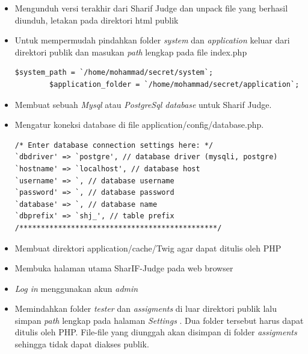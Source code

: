 \begin{itemize}
    \item Mengunduh versi terakhir dari Sharif Judge dan unpack file yang berhasil diunduh, letakan pada direktori html publik
    \item Untuk mempermudah pindahkan folder \textit{system}  dan \textit{application} keluar dari direktori publik dan masukan \textit{path} lengkap pada file index.php

     \begin{lstlisting}[basicstyle=\ttfamily, frame=single,
    columns=fullflexible, breaklines=true, numbers=none]
        $system_path = `/home/mohammad/secret/system`;
        $application_folder = `/home/mohammad/secret/application`;
    \end{lstlisting}

    \item Membuat sebuah \textit{Mysql} atau \textit{PostgreSql database} untuk Sharif Judge.
    \item Mengatur koneksi database di file application/config/database.php.

 \begin{lstlisting}[basicstyle=\ttfamily, frame=single,
    columns=fullflexible, breaklines=true, numbers=none]
/* Enter database connection settings here: */
`dbdriver' => `postgre', // database driver (mysqli, postgre)
`hostname' => `localhost', // database host
`username' => `, // database username
`password' => `, // database password
`database' => `, // database name
`dbprefix' => `shj_', // table prefix
/**********************************************/
    \end{lstlisting}


    \item Membuat direktori application/cache/Twig agar dapat ditulis oleh PHP
    \item Membuka halaman utama SharIF-Judge pada web browser \item \textit{Log in}  menggunakan akun \textit{admin}
    \item Memindahkan folder \textit{tester} dan \textit{assigments} di luar direktori publik lalu simpan \textit{path} lengkap pada halaman \textit{Settings} . Dua folder tersebut harus dapat ditulis oleh PHP. File-file yang diunggah akan disimpan di folder \textit{assigments} sehingga tidak dapat diakses publik.
\end{itemize}

